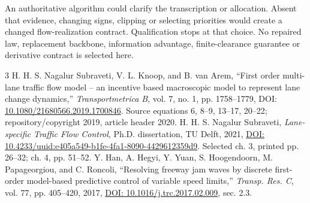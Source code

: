 \documentclass[10pt,a4paper]{article}
\begin{document}
An authoritative algorithm could clarify the transcription or allocation.
Absent that evidence, changing signs, clipping or selecting priorities
would create a changed flow-realization contract. Qualification stops at
that choice. No repaired law, replacement backbone, information advantage,
finite-clearance guarantee or derivative contract is selected here.

\begin{thebibliography}{3}\small
{} H. H. S. Nagalur Subraveti, V. L. Knoop, and B. van Arem,
``First order multi-lane traffic flow model -- an incentive based macroscopic
model to represent lane change dynamics,'' \emph{Transportmetrica B}, vol. 7,
no. 1, pp. 1758--1779, DOI: \href{https://doi.org/10.1080/21680566.2019.1700846}{10.1080/21680566.2019.1700846}.
Source equations 6, 8--9, 13--17, 20--22; repository/copyright 2019,
article header 2020.
 H. H. S. Nagalur Subraveti, \emph{Lane-specific Traffic Flow
Control}, Ph.D. dissertation, TU Delft, 2021,
\href{https://doi.org/10.4233/uuid:e405a549-b1fe-4fa1-8090-4429612359d9}{DOI: 10.4233/uuid:e405a549-b1fe-4fa1-8090-4429612359d9}.
Selected ch. 3, printed pp. 26--32; ch. 4, pp. 51--52.
 Y. Han, A. Hegyi, Y. Yuan, S. Hoogendoorn, M. Papageorgiou,
and C. Roncoli, ``Resolving freeway jam waves by discrete first-order
model-based predictive control of variable speed limits,'' \emph{Transp.
Res. C}, vol. 77, pp. 405--420, 2017,
\href{https://doi.org/10.1016/j.trc.2017.02.009}{DOI: 10.1016/j.trc.2017.02.009}, sec. 2.3.
\end{thebibliography}
\end{document}
